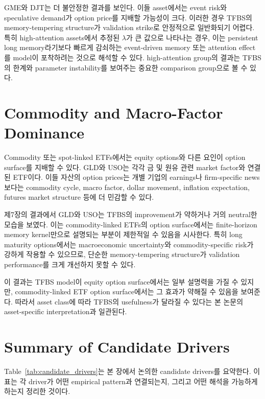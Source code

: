 \documentclass[11pt,a4paper]{report}
\begin{document}
GME와 DJT는 더 불안정한 결과를 보인다. 이들 asset에서는 event risk와 speculative demand가 option price를 지배할 가능성이 크다. 이러한 경우 TFBS의 memory-tempering structure가 validation strike로 안정적으로 일반화되기 어렵다. 특히 high-attention assets에서 추정된 \(\lambda\)가 큰 값으로 나타나는 경우, 이는 persistent long memory라기보다 빠르게 감쇠하는 event-driven memory 또는 attention effect를 model이 포착하려는 것으로 해석할 수 있다. high-attention group의 결과는 TFBS의 한계와 parameter instability를 보여주는 중요한 comparison group으로 볼 수 있다.

\section{Commodity and Macro-Factor Dominance}

Commodity 또는 spot-linked ETFs에서는 equity options와 다른 요인이 option surface를 지배할 수 있다. GLD와 USO는 각각 금 및 원유 관련 market factor와 연결된 ETF이다. 이들 자산의 option prices는 개별 기업의 earnings나 firm-specific news보다는 commodity cycle, macro factor, dollar movement, inflation expectation, futures market structure 등에 더 민감할 수 있다.

제7장의 결과에서 GLD와 USO는 TFBS의 improvement가 약하거나 거의 neutral한 모습을 보였다. 이는 commodity-linked ETFs의 option surface에서는 finite-horizon memory kernel만으로 설명되는 부분이 제한적일 수 있음을 시사한다. 특히 long maturity options에서는 macroeconomic uncertainty와 commodity-specific risk가 강하게 작용할 수 있으므로, 단순한 memory-tempering structure가 validation performance를 크게 개선하지 못할 수 있다.

이 결과는 TFBS model이 equity option surface에서는 일부 설명력을 가질 수 있지만, commodity-linked ETF option surface에서는 그 효과가 약해질 수 있음을 보여준다. 따라서 asset class에 따라 TFBS의 usefulness가 달라질 수 있다는 본 논문의 asset-specific interpretation과 일관된다.

\section{Summary of Candidate Drivers}

Table~\ref{tab:candidate_drivers}는 본 장에서 논의한 candidate drivers를 요약한다. 이 표는 각 driver가 어떤 empirical pattern과 연결되는지, 그리고 어떤 해석을 가능하게 하는지 정리한 것이다.
\end{document}
